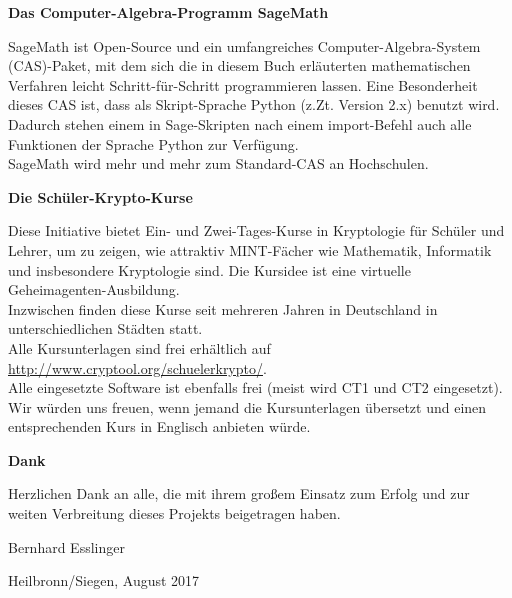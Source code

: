 \bigskip


\textbf{Das Computer-Algebra-Programm SageMath}

SageMath ist Open-Source und ein umfangreiches Computer-Algebra-System (CAS)-Paket,
mit dem sich die in diesem Buch erläuterten mathematischen Verfahren leicht
Schritt-für-Schritt programmieren lassen. Eine Besonderheit dieses CAS ist,
dass als Skript-Sprache Python (z.Zt. Version 2.x) benutzt wird.
Dadurch stehen einem in Sage-Skripten nach einem import-Befehl auch alle Funktionen
der Sprache Python zur Verfügung.\\
SageMath wird mehr und mehr zum Standard-CAS an Hochschulen.

\bigskip


\textbf{Die Schüler-Krypto-Kurse}

Diese Initiative bietet Ein- und Zwei-Tages-Kurse in Kryptologie für Schüler
und Lehrer, um zu zeigen, wie attraktiv MINT-Fächer wie Mathematik,
Informatik und insbesondere Kryptologie sind.
Die Kursidee ist eine virtuelle Geheimagenten-Ausbildung.\\
Inzwischen finden diese Kurse seit mehreren Jahren in Deutschland in
unterschiedlichen Städten statt.\\
Alle Kursunterlagen sind frei erhältlich auf
\url{http://www.cryptool.org/schuelerkrypto/}.\\
Alle eingesetzte Software ist ebenfalls frei (meist wird CT1 und CT2
eingesetzt).\\
Wir würden uns freuen, wenn jemand die Kursunterlagen übersetzt und
einen entsprechenden Kurs in Englisch anbieten würde.

\bigskip


\textbf{Dank}

Herzlichen Dank an alle, die mit ihrem großem Einsatz zum
Erfolg und zur weiten Verbreitung dieses Projekts beigetragen haben.



\vfill
Bernhard Esslinger

\bigskip

Heilbronn/Siegen, August 2017

